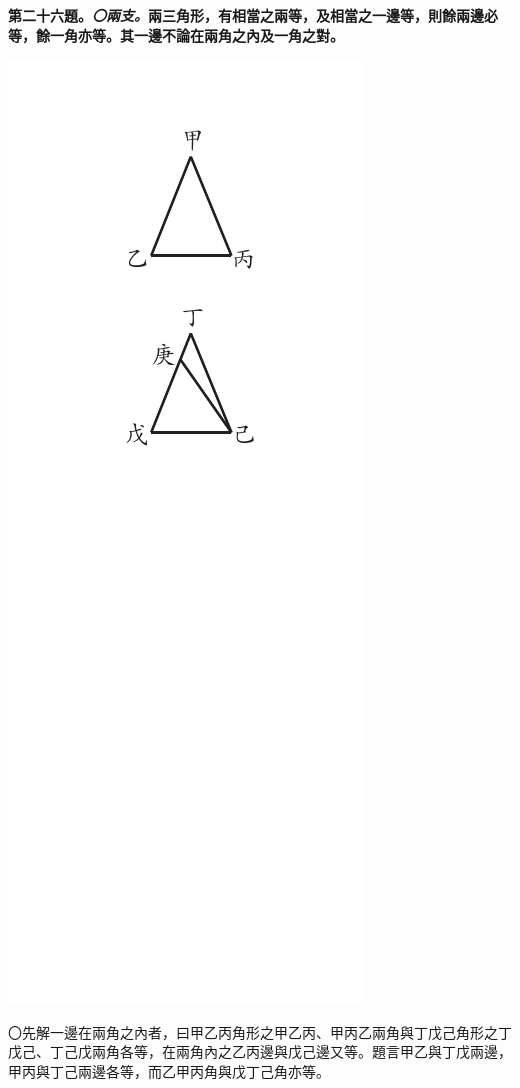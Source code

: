 \documentclass[12pt,b5paper,landscape]{article}
\newcommand{\ccom}[1]{{\footnotesize \emph{〇#1}}}
\newcommand{\bcom}[1]{〇#1}
\newcommand{\cthm}[1]{{
\vspace{8pt}

\bfseries #1}}
\begin{document}
\begin{multicols}{2}
\cthm{第二十六題。\ccom{兩支。}兩三角形，有相當之兩等，及相當之一邊等，則餘兩邊必等，餘一角亦等。其一邊不論在兩角之內及一角之對。}
\begin{center}
      \includegraphics[angle=90]{eu72}
\end{center}
\bcom{先解一邊在兩角之內者，曰甲乙丙角形之甲乙丙、甲丙乙兩角與丁戊己角形之丁戊己、丁己戊兩角各等，在兩角內之乙丙邊與戊己邊又等。題言甲乙與丁戊兩邊，甲丙與丁己兩邊各等，而乙甲丙角與戊丁己角亦等。}

\end{multicols}
\end{document}
